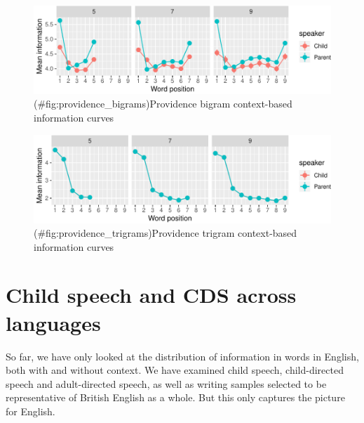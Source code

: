\documentclass[11pt,]{article}
\begin{document}
\begin{figure}
\centering
\includegraphics{paper_files/figure-latex/providence_bigrams-1.pdf}
\caption{(\#fig:providence\_bigrams)Providence bigram context-based information curves}
\end{figure}

\begin{figure}
\centering
\includegraphics{paper_files/figure-latex/providence_trigrams-1.pdf}
\caption{(\#fig:providence\_trigrams)Providence trigram context-based information curves}
\end{figure}

\hypertarget{child-speech-and-cds-across-languages}{%
\section{Child speech and CDS across languages}\label{child-speech-and-cds-across-languages}}

So far, we have only looked at the distribution of information in words in English, both with and without context. We have examined child speech, child-directed speech and adult-directed speech, as well as writing samples selected to be representative of British English as a whole. But this only captures the picture for English.
\end{document}
